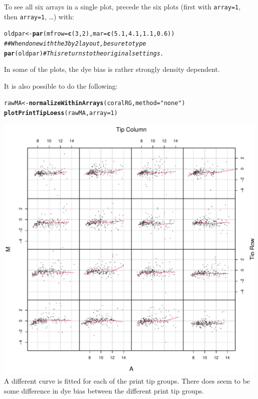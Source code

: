 \documentclass[a4paper,9pt]{article}\usepackage[]{graphicx}\usepackage[]{xcolor}
\makeatletter
\def\maxwidth{ %
  \ifdim\Gin@nat@width>\linewidth
    \linewidth
  \else
    \Gin@nat@width
  \fi
}
\newcommand{\hlnum}[1]{\textcolor[rgb]{0.686,0.059,0.569}{#1}}%
\newcommand{\hlstr}[1]{\textcolor[rgb]{0.192,0.494,0.8}{#1}}%
\newcommand{\hlcom}[1]{\textcolor[rgb]{0.678,0.584,0.686}{\textit{#1}}}%
\newcommand{\hlstd}[1]{\textcolor[rgb]{0.345,0.345,0.345}{#1}}%
\newcommand{\hlkwb}[1]{\textcolor[rgb]{0.69,0.353,0.396}{#1}}%
\newcommand{\hlkwc}[1]{\textcolor[rgb]{0.333,0.667,0.333}{#1}}%
\newcommand{\hlkwd}[1]{\textcolor[rgb]{0.737,0.353,0.396}{\textbf{#1}}}%
\newenvironment{kframe}{%
 \def\at@end@of@kframe{}%
 \ifinner\ifhmode%
  \def\at@end@of@kframe{\end{minipage}}%
  \begin{minipage}{\columnwidth}%
 \fi\fi%
 \def\FrameCommand##1{\hskip\@totalleftmargin \hskip-\fboxsep
 \colorbox{shadecolor}{##1}\hskip-\fboxsep
     \hskip-\linewidth \hskip-\@totalleftmargin \hskip\columnwidth}%
 \MakeFramed {\advance\hsize-\width
   \@totalleftmargin\z@ \linewidth\hsize
   \@setminipage}}%
 {\par\unskip\endMakeFramed%
 \at@end@of@kframe}
\newenvironment{knitrout}{}{} %
\makeatother
\begin{document}
To see all six arrays in a single plot, precede the six plots
(first with \texttt{array=1}, then \texttt{array=1}, \ldots)
with:
\begin{knitrout}
\color{fgcolor}\begin{kframe}
\begin{alltt}
\hlstd{oldpar} \hlkwb{<-} \hlkwd{par}\hlstd{(}\hlkwc{mfrow}\hlstd{=}\hlkwd{c}\hlstd{(}\hlnum{3}\hlstd{,}\hlnum{2}\hlstd{),} \hlkwc{mar}\hlstd{=}\hlkwd{c}\hlstd{(}\hlnum{5.1}\hlstd{,} \hlnum{4.1}\hlstd{,} \hlnum{1.1}\hlstd{,} \hlnum{0.6}\hlstd{))}
\hlcom{## When done with the 3 by 2 layout, be sure to type}
\hlkwd{par}\hlstd{(oldpar)}     \hlcom{# This returns to the original settings.}
\end{alltt}
\end{kframe}
\end{knitrout}
In some of the plots, the dye bias is rather strongly density dependent.

It is also possible to do the following:
\begin{knitrout}
\color{fgcolor}\begin{kframe}
\begin{alltt}
\hlstd{rawMA} \hlkwb{<-} \hlkwd{normalizeWithinArrays}\hlstd{(coralRG,} \hlkwc{method} \hlstd{=} \hlstr{"none"}\hlstd{)}
\hlkwd{plotPrintTipLoess}\hlstd{(rawMA,} \hlkwc{array}\hlstd{=}\hlnum{1}\hlstd{)}
\end{alltt}
\end{kframe}
\includegraphics[width=\maxwidth]{figure/unnamed-chunk-8-1} 
\end{knitrout}
A different curve is fitted for each of the print tip groups.
There does seem to be some difference in dye bias between the
different print tip groups.
\end{document}
